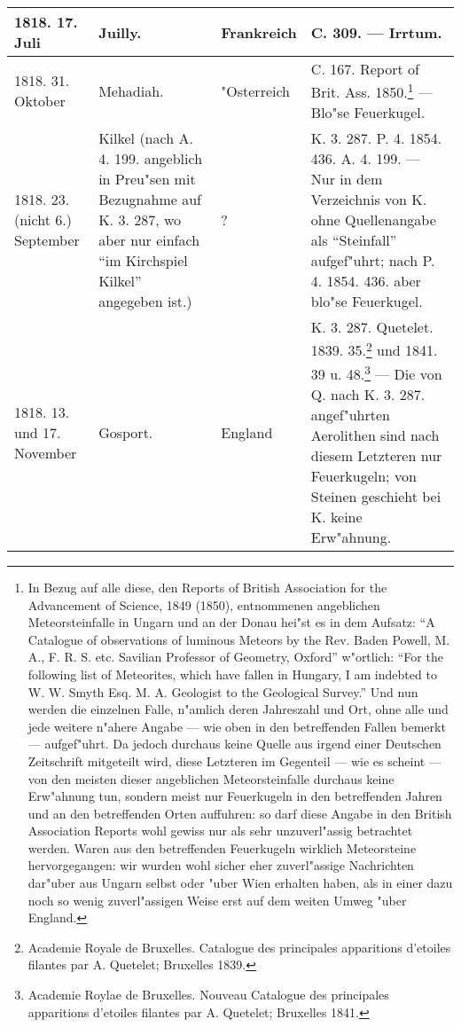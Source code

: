 \documentclass[a4paper, 8pt, oneside, polutonikogreek, german]{article}
\begin{document}
\begin{center}
\begin{longtable}{| p{20mm} | p{25mm} | p{16mm} | p{50mm} |}
        1818. 17. Juli & Juilly. & Frankreich & C. 309. --- Irrtum. \\ \hline
        1818. 31. Oktober & Mehadiah. & "Osterreich & C. 167. Report of Brit. Ass. 1850.\footnote{In Bezug auf alle diese, den Reports of British Association for the Advancement of Science, 1849 (1850), entnommenen angeblichen Meteorsteinfalle in Ungarn und an der Donau hei"st es in dem Aufsatz: "`A Catalogue of observations of luminous Meteors by the Rev. Baden Powell, M. A., F. R. S. etc. Savilian Professor of Geometry, Oxford"' w"ortlich: "`For the following list of Meteorites, which have fallen in Hungary, I am indebted to W. W. Smyth Esq. M. A. Geologist to the Geological Survey."' Und nun werden die einzelnen Falle, n"amlich deren Jahreszahl und Ort, ohne alle und jede weitere n"ahere Angabe --- wie oben in den betreffenden Fallen bemerkt --- aufgef"uhrt. Da jedoch durchaus keine Quelle aus irgend einer Deutschen Zeitschrift mitgeteilt wird, diese Letzteren im Gegenteil --- wie es scheint --- von den meisten dieser angeblichen Meteorsteinfalle durchaus keine Erw"ahnung tun, sondern meist nur Feuerkugeln in den betreffenden Jahren und an den betreffenden Orten auffuhren: so darf diese Angabe in den British Association Reports wohl gewiss nur als sehr unzuverl"assig betrachtet werden. Waren aus den betreffenden Feuerkugeln wirklich Meteorsteine hervorgegangen: wir wurden wohl sicher eher zuverl"assige Nachrichten dar"uber aus Ungarn selbst oder "uber Wien erhalten haben, als in einer dazu noch so wenig zuverl"assigen Weise erst auf dem weiten Umweg "uber England.} --- Blo"se Feuerkugel. \\ \hline
        1818. 23. (nicht 6.) September & Kilkel (nach A. 4. 199. angeblich in Preu"sen mit Bezugnahme auf K. 3. 287, wo aber nur einfach "`im Kirchspiel Kilkel"' angegeben ist.) & ? & K. 3. 287. P. 4. 1854. 436. A. 4. 199. --- Nur in dem Verzeichnis von K. ohne Quellenangabe als "`Steinfall"' aufgef"uhrt; nach P. 4. 1854. 436. aber blo"se Feuerkugel. \\ \hline
        1818. 13. und 17. November & Gosport. & England & K. 3. 287. Quetelet. 1839. 35.\footnote{Academie Royale de Bruxelles. Catalogue des principales apparitions d'etoiles filantes par A. Quetelet; Bruxelles 1839.} und 1841. 39 u. 48.\footnote{Academie Roylae de Bruxelles. Nouveau Catalogue des principales apparitions d'etoiles filantes par A. Quetelet; Bruxelles 1841.} --- Die von Q. nach K. 3. 287. angef"uhrten Aerolithen sind nach diesem Letzteren nur Feuerkugeln; von Steinen geschieht bei K. keine Erw"ahnung. \\ \hline

\end{longtable}
\end{center}
\end{document}

